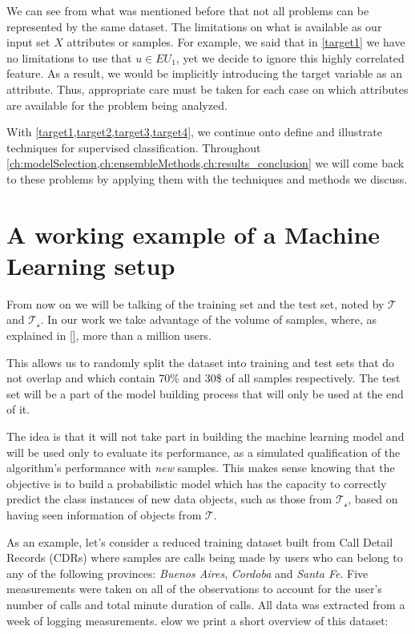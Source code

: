 

We can see from what was mentioned before that not all problems can be represented by the same dataset.
The limitations on what is available as our input set $X$ attributes or samples.
For example, we said that in \cref{target1} we have no limitations to use that $u \in EU_{1}$, yet we decide to ignore this highly correlated feature.
As a result, we  would be implicitly introducing the target variable as an attribute.
Thus, appropriate care must be taken for each case on which attributes are available for the problem being analyzed.


With \cref{target1,target2,target3,target4}, we continue onto define and illustrate techniques for supervised classification.
Throughout \cref{ch:modelSelection,ch:ensembleMethods,ch:results_conclusion} we will come back to these problems by applying them with the techniques and methods we discuss.


\section{A working example of a Machine Learning setup}\label{section-example}

From now on we will be talking of the training set and the test set, noted by $\mathcal{T}$  and $\mathcal{T_s}$.
In our work we take advantage of the volume of samples, where, as explained in \cref{}, more than a million users.

This allows us to randomly split the dataset into training and test sets that do not overlap and which contain 70\% and 30\$ of all samples respectively.
The test set will be a part of the model building process that will only be used at the end of it.

The idea is that it will not take part in building the machine learning model and will be used only to evaluate its performance, as a simulated qualification of the algorithm's performance with \textit{new} samples.
This makes sense knowing that the objective is to build a probabilistic model which has the capacity to correctly predict the class instances of new data objects, such as those from $\mathcal{T_s}$, based on having seen information of objects from $\mathcal{T}$.

As an example, let's consider a reduced training dataset built from Call Detail Records (CDRs) where samples are calls being made by users who can belong to any of the following provinces: \textit{Buenos Aires}, \textit{Cordoba} and \textit{Santa Fe}.
Five measurements were taken on all of the observations to account for the user's number of calls and total minute duration of calls.
All data was extracted from a week of logging measurements.
elow we print a short overview of this dataset:

